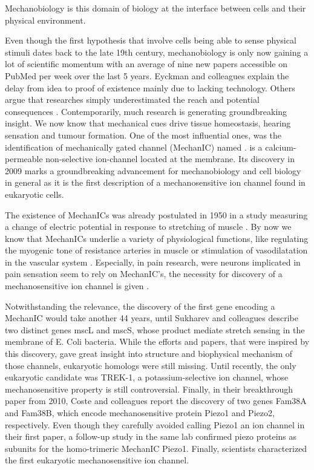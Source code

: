 Mechanobiology is this domain of biology at the interface between cells and their physical environment. 

Even though the first hypothesis that involve cells being able to sense physical stimuli dates back to the late 19th century, mechanobiology is only now gaining a lot of scientific momentum with an average of nine new papers accessible on PubMed per week over the last 5 years. Eyckman and colleagues explain the delay from idea to proof of existence mainly due to lacking technology.\cite{Eyckmans2011} Others argue that researches simply underestimated the reach and potential consequences . Contemporarily, much research is generating groundbreaking insight. We now know that mechanical cues drive tissue homeostasis, hearing sensation and tumour formation. \cite{McHugh2012} One of the most influential ones, was the identification of mechanically gated channel (MechanIC) named \Piezo{}.
\Piezo{} is a calcium-permeable non-selective ion-channel located at the membrane. Its discovery in 2009 marks a groundbreaking advancement for mechanobiology and cell biology in general as it is the first description of a mechanosensitive ion channel found in eukaryotic cells.\cite{Coste2010} 

The existence of MechanICs was already postulated in 1950 in a study measuring a change of electric potential in response to stretching of muscle \cite{Katz1949}. By now we know that MechanICs underlie a variety of physiological functions, like regulating the myogenic tone of resistance arteries in muscle \cite{Murthy2017} or stimulation of vasodilatation in the vascular system \cite{Zeng2018}. Especially, in pain research, were neurons implicated in pain sensation seem to rely on MechanIC’s, the necessity for discovery of a mechanosensitive ion channel is given . 

Notwithstanding the relevance, the discovery of the first gene encoding a MechanIC would take another 44 years, until Sukharev and colleagues describe two distinct genes mscL and mscS, whose product mediate stretch sensing in the membrane of E. Coli bacteria. While the efforts and papers, that were inspired by this discovery, gave great insight into structure and biophysical mechanism of those channels, eukaryotic homologs were still missing. Until recently, the only eukaryotic candidate was TREK-1, a potassium-selective ion channel, whose mechanosensitive property is still controversial. 
Finally, in their breakthrough paper from 2010, Coste and colleagues report the discovery of two genes Fam38A and Fam38B, which encode mechanosensitive protein Piezo1 and Piezo2, respectively. Even though they carefully avoided calling Piezo1 an ion channel in their first paper, a follow-up study in the same lab confirmed piezo proteins as subunits for the homo-trimeric MechanIC Piezo1. Finally, scientists characterized the first eukaryotic mechanosensitive ion channel. 

